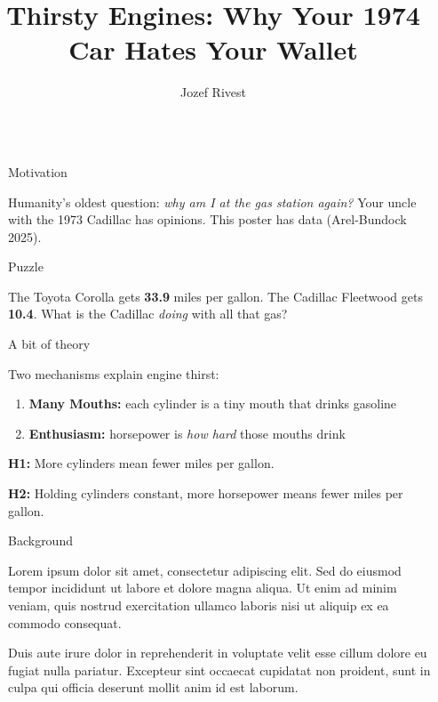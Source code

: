 \documentclass[final]{beamer}
\title{Thirsty Engines: Why Your 1974 Car Hates Your Wallet}
\author{Jozef Rivest}
\institute[shortinst]{University of Michigan}
\providecommand{\tightlist}{%
  \setlength{\itemsep}{0pt}\setlength{\parskip}{0pt}}
\newlength{\sepwidth}
\newlength{\colwidth}
\newcommand{\separatorcolumn}{\begin{column}{\sepwidth}\end{column}}
\begin{document}
\begin{frame}[t,fragile]
	\begin{columns}[t]

		\separatorcolumn

\begin{column}{\colwidth}

\begin{block}{Motivation}

Humanity's oldest question: \emph{why am I at the gas station again?}
Your uncle with the 1973 Cadillac has opinions. This poster has data
(Arel-Bundock 2025).

\end{block}

\begin{block}{Puzzle}

The Toyota Corolla gets \textbf{33.9} miles per gallon. The Cadillac
Fleetwood gets \textbf{10.4}. What is the Cadillac \emph{doing} with all
that gas?

\end{block}

\begin{block}{A bit of theory}

Two mechanisms explain engine thirst:

\begin{enumerate}
\def\labelenumi{\arabic{enumi}.}
\tightlist
\item
  \textbf{Many Mouths:} each cylinder is a tiny mouth that drinks
  gasoline
\item
  \textbf{Enthusiasm:} horsepower is \emph{how hard} those mouths drink
\end{enumerate}

\textbf{H1:} More cylinders mean fewer miles per gallon.

\textbf{H2:} Holding cylinders constant, more horsepower means fewer
miles per gallon.

\end{block}

\begin{block}{Background}

Lorem ipsum dolor sit amet, consectetur adipiscing elit. Sed do eiusmod
tempor incididunt ut labore et dolore magna aliqua. Ut enim ad minim
veniam, quis nostrud exercitation ullamco laboris nisi ut aliquip ex ea
commodo consequat.

Duis aute irure dolor in reprehenderit in voluptate velit esse cillum
dolore eu fugiat nulla pariatur. Excepteur sint occaecat cupidatat non
proident, sunt in culpa qui officia deserunt mollit anim id est laborum.


\end{block}
\end{column}
\end{columns}
\end{frame}
\end{document}
